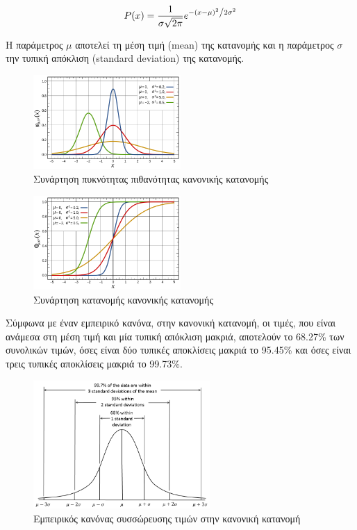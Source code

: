 \[P(x) = \frac{1}{{\sigma \sqrt {2\pi } }}e^{{{ - \left( {x - \mu } \right)^2 } \mathord{\left/ {\vphantom {{ - \left( {x - \mu } \right)^2 } {2\sigma ^2 }}} \right. \kern-\nulldelimiterspace} {2\sigma ^2 }}}\]

Η παράμετρος \(\mu\) αποτελεί τη μέση τιμή (mean) της κατανομής και η παράμετρος \(\sigma\) την τυπική απόκλιση (standard deviation) της κατανομής. 

\begin{figure}[H]
  \centering
  \includegraphics[width=0.5\textwidth]{figures/gauss_1.png}
  \caption{Συνάρτηση πυκνότητας πιθανότητας κανονικής κατανομής}
\end{figure}

\begin{figure}[H]
  \centering
  \includegraphics[width=0.5\textwidth]{figures/gauss_2.png}
  \caption{Συνάρτηση κατανομής κανονικής κατανομής}
\end{figure}

Σύμφωνα με έναν 
εμπειρικό κανόνα, στην κανονική κατανομή, οι τιμές, που είναι ανάμεσα στη μέση τιμή και μία τυπική απόκλιση μακριά, αποτελούν το 68.27\% των συνολικών τιμών, 
όσες είναι δύο τυπικές αποκλίσεις μακριά το 95.45\% και όσες είναι τρεις τυπικές αποκλίσεις μακριά το 99.73\%. 

\begin{figure}[H]
  \centering
  \includegraphics[width=0.6\textwidth]{figures/Empirical_Rule.PNG}
  \caption{Εμπειρικός κανόνας συσσώρευσης τιμών στην κανονική κατανομή}
\end{figure}
